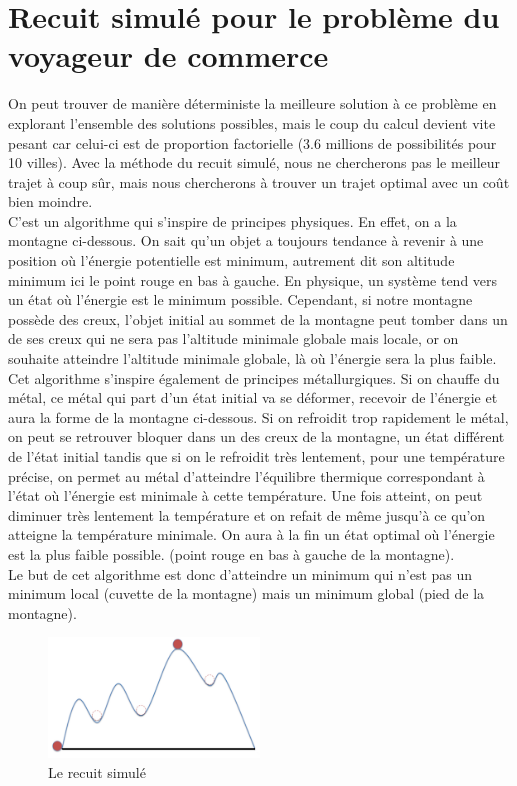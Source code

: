 \documentclass{article}
\begin{document}
\section{Recuit simulé pour le problème du voyageur de commerce}
On peut trouver de manière déterministe la meilleure solution à ce problème en explorant l’ensemble des solutions possibles, mais le coup du calcul devient vite pesant car celui-ci est de proportion factorielle (3.6 millions de possibilités pour 10 villes). Avec la méthode du recuit simulé, nous ne chercherons pas le meilleur trajet à coup sûr, mais nous chercherons à trouver un trajet optimal avec un coût bien moindre.\\
C’est un algorithme qui s’inspire de principes physiques. En effet, on a la montagne ci-dessous. On sait qu’un objet a toujours tendance à revenir à une position où l’énergie potentielle est minimum, autrement dit son altitude minimum ici le point rouge en bas à gauche. En physique, un système tend vers un état où l’énergie est le minimum possible. Cependant, si notre montagne possède des creux, l’objet initial au sommet de la montagne peut tomber dans un de ses creux qui ne sera pas l’altitude minimale globale mais locale, or on souhaite atteindre l’altitude minimale globale, là où l’énergie sera la plus faible.\\
 Cet algorithme s’inspire également de principes métallurgiques. Si on chauffe du métal, ce métal qui part d’un état initial va se déformer, recevoir de l’énergie et aura la forme de la montagne ci-dessous. Si on refroidit trop rapidement le métal, on peut se retrouver bloquer dans un des creux de la montagne, un état différent de l’état initial tandis que si on le refroidit très lentement, pour une température précise, on permet au métal d’atteindre l’équilibre thermique correspondant à l’état où l’énergie est minimale à cette température. Une fois atteint, on peut diminuer très lentement la température et on refait de même jusqu’à ce qu’on atteigne la température minimale. On aura à la fin un état optimal où l’énergie est la plus faible possible. (point rouge en bas à gauche de la montagne).\\
Le but de cet algorithme est donc d’atteindre un minimum qui n’est pas un minimum local (cuvette de la montagne) mais un minimum global (pied de la montagne).\\
\begin{figure}[h]\centering
\includegraphics[width=0.5\textwidth]{rcd}
\caption{Le recuit simulé}
\end{figure}\\
\end{document}
